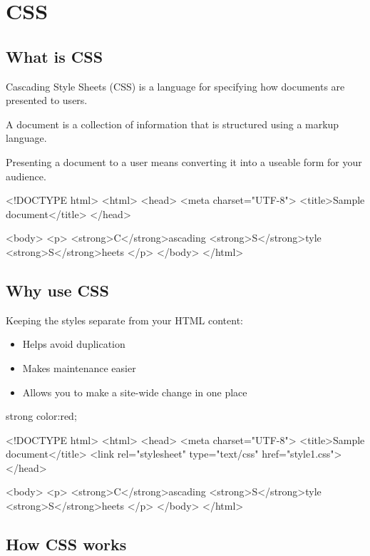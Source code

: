\chapter{CSS}

\section{What is CSS}

Cascading Style Sheets (CSS) is a language for specifying how documents are presented to users.

A document is a collection of information that is structured using a markup language.

Presenting a document to a user means converting it into a useable form for your audience.

\begin{HTML5}[demo]
<!DOCTYPE html>
<html>
  <head>
  <meta charset="UTF-8">
  <title>Sample document</title>
  </head>

  <body>
    <p>
      <strong>C</strong>ascading
      <strong>S</strong>tyle
      <strong>S</strong>heets
    </p>
  </body>
</html>
\end{HTML5}

\section{Why use CSS}

Keeping the styles separate from your HTML content:
\begin{itemize}
\item Helps avoid duplication
\item Makes maintenance easier
\item Allows you to make a site-wide change in one place
\end{itemize}


\begin{CSS}
strong {color:red;}
\end{CSS}

\begin{HTML5}
<!DOCTYPE html>
<html>
  <head>
  <meta charset="UTF-8">
  <title>Sample document</title>
  <link rel="stylesheet" type="text/css" href="style1.css">
  </head>

  <body>
    <p>
      <strong>C</strong>ascading
      <strong>S</strong>tyle
      <strong>S</strong>heets
    </p>
  </body>
</html>
\end{HTML5}

\section{How CSS works}

